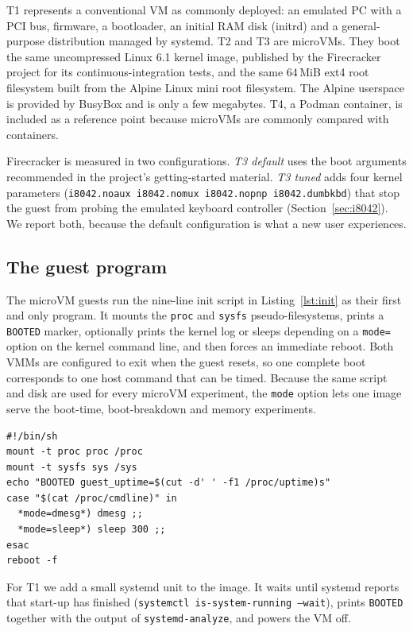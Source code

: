 \documentclass[pdflatex,sn-mathphys-num]{sn-jnl}%
\begin{document}
T1 represents a conventional VM as commonly deployed: an emulated PC with a PCI bus, firmware, a bootloader, an initial RAM disk (initrd) and a general-purpose distribution managed by systemd. T2 and T3 are microVMs. They boot the same uncompressed Linux 6.1 kernel image, published by the Firecracker project for its continuous-integration tests, and the same 64\,MiB ext4 root filesystem built from the Alpine Linux mini root filesystem. The Alpine userspace is provided by BusyBox and is only a few megabytes. T4, a Podman container, is included as a reference point because microVMs are commonly compared with containers.

Firecracker is measured in two configurations. \emph{T3 default} uses the boot arguments recommended in the project's getting-started material. \emph{T3 tuned} adds four kernel parameters (\texttt{i8042.noaux i8042.nomux i8042.nopnp i8042.dumbkbd}) that stop the guest from probing the emulated keyboard controller (Section~\ref{sec:i8042}). We report both, because the default configuration is what a new user experiences.

\subsection{The guest program}

The microVM guests run the nine-line init script in Listing~\ref{lst:init} as their first and only program. It mounts the \texttt{proc} and \texttt{sysfs} pseudo-filesystems, prints a \texttt{BOOTED} marker, optionally prints the kernel log or sleeps depending on a \texttt{mode=} option on the kernel command line, and then forces an immediate reboot. Both VMMs are configured to exit when the guest resets, so one complete boot corresponds to one host command that can be timed. Because the same script and disk are used for every microVM experiment, the \texttt{mode} option lets one image serve the boot-time, boot-breakdown and memory experiments.

\begin{lstlisting}[caption={Init script of the microVM guest (\texttt{guest/init})},label={lst:init},float=ht]
#!/bin/sh
mount -t proc proc /proc
mount -t sysfs sys /sys
echo "BOOTED guest_uptime=$(cut -d' ' -f1 /proc/uptime)s"
case "$(cat /proc/cmdline)" in
  *mode=dmesg*) dmesg ;;
  *mode=sleep*) sleep 300 ;;
esac
reboot -f
\end{lstlisting}

For T1 we add a small systemd unit to the image. It waits until systemd reports that start-up has finished (\texttt{systemctl is-system-running --wait}), prints \texttt{BOOTED} together with the output of \texttt{systemd-analyze}, and powers the VM off.
\end{document}
